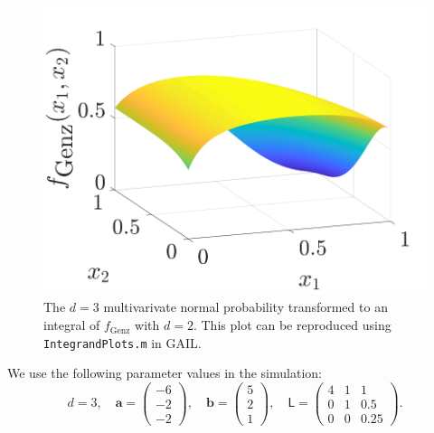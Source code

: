\documentclass{iitthesis}          %
\newcommand{\bm}[1]{\boldsymbol{#1}}
\newcommand{\va}{\bm{a}}
\newcommand{\vb}{\bm{b}}
\newcommand{\mL}{\mathsf{L}}
\newcommand{\code}[1]{\texttt{#1}}
\begin{document}
\begin{figure}
	\centering
		\includegraphics[width=0.75\linewidth]{GenzFunc_varTx_none}
	\caption{The $d=3$ multivarivate normal probability transformed to an integral of $f_{\text{Genz}}$ with  $d=2$. This plot can be reproduced using \code{IntegrandPlots.m} in GAIL.}
	\label{fig:MVN_Genz}
\end{figure}

We use the following parameter values in the simulation: 
\begin{equation*}
d = 3, \quad \va = \begin{pmatrix}
-6 \\ -2 \\ -2
\end{pmatrix}, \quad 
\vb = \begin{pmatrix}
5 \\ 2 \\ 1
\end{pmatrix} , \quad 
\mL = \begin{pmatrix}
4 & 1 & 1 \\ 0 & 1 & 0.5 \\ 0 & 0 & 0.25
\end{pmatrix}.
\end{equation*}
\end{document}

